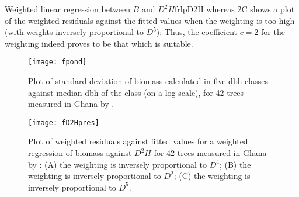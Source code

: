 \begin{filrouge}{Weighted linear regression between $B$ and $D^2H$}{frlpD2H}
%
whereas \ref{fD2Hpres}C shows a plot of the weighted residuals against the fitted values when the weighting is too high (with weights inversely proportional to $D^5$):
%
Thus, the coefficient $c=2$ for the weighting indeed proves to be that which is suitable.

\end{filrouge}

\begin{figure}[htb]
\begin{center}
\texttt{[image: fpond]}
\end{center}
\caption[Plot of standard deviation of biomass calculated in five dbh classes against median dbh of the class, for 42 trees measured in Ghana by \citet{henry10}]{Plot of standard deviation of biomass calculated in five dbh classes against median dbh of the class (on a log scale), for 42 trees measured in Ghana by \citet{henry10}.\label{fpond}}
\end{figure}

\begin{figure}[htbp]
\begin{center}
\texttt{[image: fD2Hpres]}
\end{center}
\caption[Plot of weighted residuals against fitted values for a weighted regression of biomass against $D^2H$ for 42 trees measured in Ghana by \citet{henry10}]{Plot of weighted residuals against fitted values for a weighted regression of biomass against $D^2H$ for 42 trees measured in Ghana by \citet{henry10}: (A) the weighting is inversely proportional to $D^4$; (B) the weighting is inversely proportional to $D^2$; (C) the weighting is inversely proportional to $D^5$.\label{fD2Hpres}}
\end{figure}

